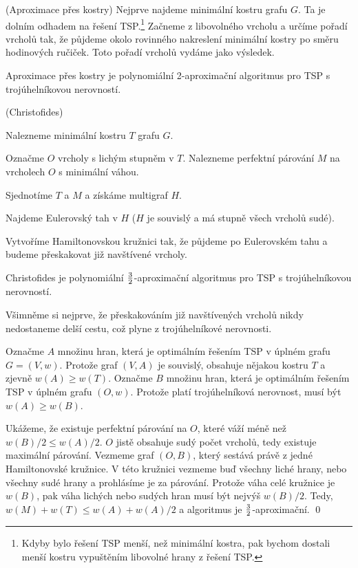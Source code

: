 \alg (Aproximace přes kostry) Nejprve najdeme minimální kostru grafu $G$. Ta je
dolním odhadem na řešení TSP.\footnote{Kdyby bylo řešení TSP menší, než
minimální kostra, pak bychom dostali menší kostru vypuštěním libovolné hrany z
řešení TSP.} Začneme z libovolného vrcholu a určíme pořadí vrcholů tak, že
půjdeme okolo rovinného nakreslení minimální kostry po směru hodinových ručiček.
Toto pořadí vrcholů vydáme jako výsledek.

\vt Aproximace přes kostry je polynomiální 2-aproximační algoritmus pro TSP s
trojúhelníkovou nerovností.

\alg (Christofides)
\begin{enumerate*}
\item Nalezneme minimální kostru $T$ grafu $G$.
\item Označme $O$ vrcholy s lichým stupněm v $T$. Nalezneme perfektní párování
$M$ na vrcholech $O$ s minimální váhou.
\item Sjednotíme $T$ a $M$ a získáme multigraf $H$.
\item Najdeme Eulerovský tah v $H$ ($H$ je souvislý a má stupně všech vrcholů sudé).
\item Vytvoříme Hamiltonovskou kružnici tak, že půjdeme po Eulerovském tahu a
budeme přeskakovat již navštívené vrcholy.
\end{enumerate*}

\vt Christofides je polynomiální $3\over 2$-aproximační algoritmus pro TSP s
trojúhelníkovou nerovností.

\dk Všimněme si nejprve, že přeskakováním již navštívených vrcholů nikdy
nedostaneme delší cestu, což plyne z trojúhelníkové nerovnosti.

Označme $A$ množinu hran, která je optimálním řešením TSP v úplném grafu $G =
(V,w)$. Protože graf $(V,A)$ je souvislý, obsahuje nějakou kostru $T$ a zjevně
$w(A) \ge w(T)$. Označme $B$ množinu hran, která je optimálním řešením TSP v
úplném grafu $(O,w)$. Protože platí trojúhelníková nerovnost, musí být $w(A) \ge
w(B)$.

Ukážeme, že existuje perfektní párování na $O$, které váží méně než $w(B)/2 \le
w(A)/2$. $O$ jistě obsahuje sudý počet vrcholů, tedy existuje maximální
párování. Vezmeme graf $(O,B)$, který sestává právě z jedné Hamiltonovské
kružnice. V této kružnici vezmeme buď všechny liché hrany, nebo všechny sudé
hrany a prohlásíme je za párování. Protože váha celé kružnice je $w(B)$, pak
váha lichých nebo sudých hran musí být nejvýš $w(B)/2$. Tedy, $w(M) + w(T) \le
w(A) + w(A)/2$ a algoritmus je $3\over 2$-aproximační. 
\qed

